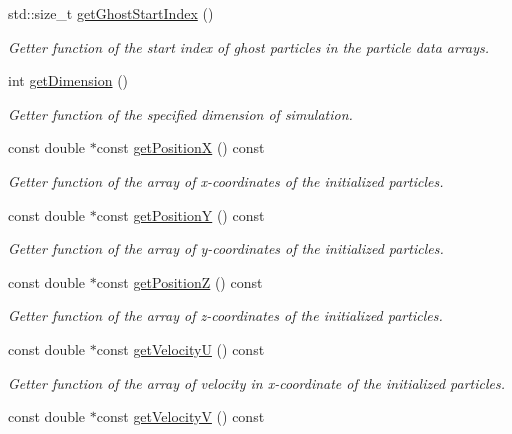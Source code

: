 \begin{DoxyCompactItemize}
std\-::size\-\_\-t \hyperlink{classParticleData_aff6d2d9b42cf767c17e3d40e5e3f45af}{get\-Ghost\-Start\-Index} ()
\begin{DoxyCompactList}\small\item\em Getter function of the start index of ghost particles in the particle data arrays. \end{DoxyCompactList}\item 
int \hyperlink{classParticleData_a60ceebcf0e4d76dfc5ce1a8f2875d735}{get\-Dimension} ()
\begin{DoxyCompactList}\small\item\em Getter function of the specified dimension of simulation. \end{DoxyCompactList}\item 
const double $\ast$const \hyperlink{classParticleData_a0bc37c6de97d72802a050c8fcdcf992c}{get\-Position\-X} () const 
\begin{DoxyCompactList}\small\item\em Getter function of the array of x-\/coordinates of the initialized particles. \end{DoxyCompactList}\item 
const double $\ast$const \hyperlink{classParticleData_a35f579e90be114099676a825c543a27e}{get\-Position\-Y} () const 
\begin{DoxyCompactList}\small\item\em Getter function of the array of y-\/coordinates of the initialized particles. \end{DoxyCompactList}\item 
const double $\ast$const \hyperlink{classParticleData_ac95f723b00a4af40954290c4ba50a6f8}{get\-Position\-Z} () const 
\begin{DoxyCompactList}\small\item\em Getter function of the array of z-\/coordinates of the initialized particles. \end{DoxyCompactList}\item 
const double $\ast$const \hyperlink{classParticleData_ae542ee996372ad5cd3514df7c953a5e9}{get\-Velocity\-U} () const 
\begin{DoxyCompactList}\small\item\em Getter function of the array of velocity in x-\/coordinate of the initialized particles. \end{DoxyCompactList}\item 
const double $\ast$const \hyperlink{classParticleData_af81222ef767e1064575ac03b8be5786e}{get\-Velocity\-V} () const 

\end{DoxyCompactItemize}
